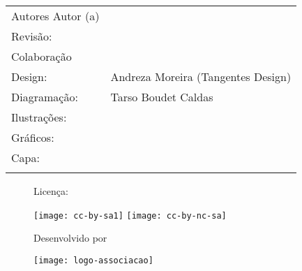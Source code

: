{\begin{titlingpage}
\begin{tabular}{p{}p{}}
			\ifauthors Autores \else Autor (a) \fi  & \la@author@table        \\

			\ifrevisao
			Revisão:                                           &  \la@revisao            \\
			\fi

			\ifdefined\la@colaboracao
			Colaboração                                        & \la@colaboracao                                                         \\
			\else\fi

			Design:                                            & Andreza Moreira (Tangentes Design)                                    \\

			Diagramação:                                       & Tarso Boudet Caldas                                                          \\

			\ifdefined\la@ilustracao
			Ilustrações:                                       & \la@ilustracao                                                          \\
			\else\fi

			\ifdefined\la@graficos
			Gráficos:                                          & \la@graficos                                                            \\
			\else\fi

			\ifdefined\la@autorcapa
			Capa:                                              & \la@autorcapa                                                           \\
			\else\fi
		\end{tabular}

		\vfill
		\begin{figure}[b]
			\begin{minipage}[l]{5cm}
				\centering

				{\large Licença:}

				\vspace{1em}

				\ifdefined\la@ccbysa
					\texttt{[image: cc-by-sa1]}
				\else
					\texttt{[image: cc-by-nc-sa]}
				\fi

			\end{minipage}\hfill
			\begin{minipage}[c]{5cm}
				\centering
				{\large Desenvolvido por}

				\vspace{1em}
				\texttt{[image: logo-associacao]}
			\end{minipage}\hfill
			\begin{minipage}[r]{5cm}
				\centering


\end{minipage}
\end{figure}
\end{titlingpage}}
